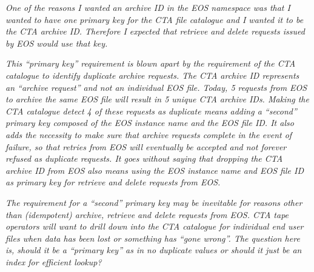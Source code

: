 \textit{One of the reasons I wanted an archive ID in the EOS namespace was that I wanted to have one primary key for the CTA
file catalogue and I wanted it to be the CTA archive ID. Therefore I expected that retrieve and delete requests issued
by EOS would use that key.}

\textit{This ``primary key'' requirement is blown apart by the requirement of the CTA catalogue to
identify duplicate archive requests.  The CTA archive ID represents an ``archive request'' and not an individual EOS file.
Today, 5 requests from EOS to archive the same EOS file will result in 5 unique CTA archive IDs. Making the CTA catalogue
detect 4 of these requests as duplicate means adding a ``second'' primary key composed of the EOS instance name and the EOS
file ID. It also adds the necessity to make sure that archive requests complete in the event of failure, so that retries
from EOS will eventually be accepted and not forever refused as duplicate requests.  It goes without saying that dropping
the CTA archive ID from EOS also means using the EOS instance name and EOS file ID as primary key for retrieve and delete
requests from EOS.}

\textit{The requirement for a ``second'' primary key may be inevitable for reasons other than (idempotent) archive, retrieve and
delete requests from EOS.  CTA tape operators will want to drill down into the CTA catalogue for individual end user files
when data has been lost or something has ``gone wrong''.  The question here is, should it be a ``primary key'' as in no
duplicate values or should it just be an index for efficient lookup?}

